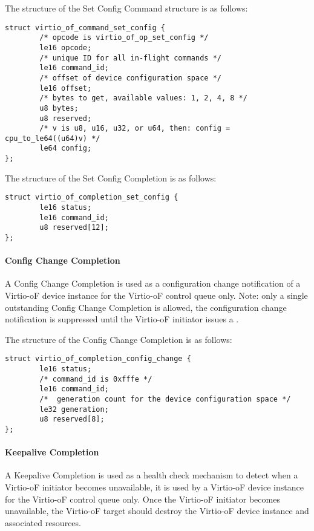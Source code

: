 The structure of the Set Config Command structure is as follows:
\begin{lstlisting}
struct virtio_of_command_set_config {
        /* opcode is virtio_of_op_set_config */
        le16 opcode;
        /* unique ID for all in-flight commands */
        le16 command_id;
        /* offset of device configuration space */
        le16 offset;
        /* bytes to get, available values: 1, 2, 4, 8 */
        u8 bytes;
        u8 reserved;
        /* v is u8, u16, u32, or u64, then: config = cpu_to_le64((u64)v) */
        le64 config;
};
\end{lstlisting}

The structure of the Set Config Completion is as follows:
\begin{lstlisting}
struct virtio_of_completion_set_config {
        le16 status;
        le16 command_id;
        u8 reserved[12];
};
\end{lstlisting}

\paragraph{Config Change Completion}\label{sec:Virtio Transport Options / Virtio Over Fabrics / Commands Definition / Opcodes / Config Change Completion}
A Config Change Completion is used as a configuration change notification of a Virtio-oF device instance for the Virtio-oF control queue only.
Note: only a single outstanding Config Change Completion is allowed, the configuration change notification is suppressed until the Virtio-oF initiator issues a
.

The structure of the Config Change Completion is as follows:
\begin{lstlisting}
struct virtio_of_completion_config_change {
        le16 status;
        /* command_id is 0xfffe */
        le16 command_id;
        /*  generation count for the device configuration space */
        le32 generation;
        u8 reserved[8];
};
\end{lstlisting}

\paragraph{Keepalive Completion}\label{sec:Virtio Transport Options / Virtio Over Fabrics / Commands Definition / Opcodes / Keepalive Completion}
A Keepalive Completion is used as a health check mechanism to detect when a Virtio-oF initiator becomes unavailable, it is used by a Virtio-oF device instance for the Virtio-oF control queue only.
Once the Virtio-oF initiator becomes unavailable, the Virtio-oF target should destroy the Virtio-oF device instance and associated resources.
